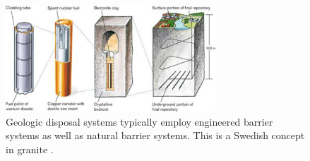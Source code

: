 \begin{figure}[htbp!]
  \begin{center}
    \includegraphics[width=0.7\textwidth]{./images/skb_components.eps}
  \end{center}
  \caption{Geologic disposal systems typically employ engineered barrier 
    systems as well as natural barrier systems. This is a Swedish concept in 
    granite \cite{ab_long-term_2006}.}
  \label{fig:skb_components}
\end{figure}
